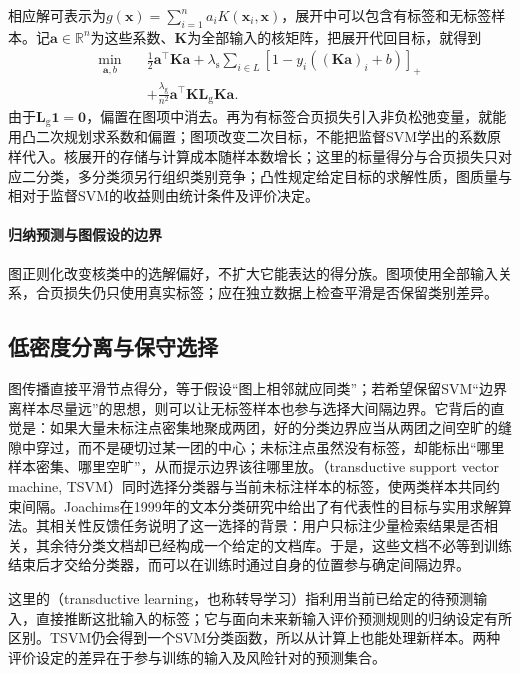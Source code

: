 相应解可表示为$g(\bm{x})=\sum_{i=1}^{n}a_iK(\bm{x}_i,\bm{x})$，展开中可以包含有标签和无标签样本。记$\bm a\in\mathbb R^n$为这些系数、$\bm K$为全部输入的核矩阵，把展开代回目标，就得到
\[
 \begin{aligned}
  \min_{\bm a,b}\quad&\frac12\bm a^\top\bm K\bm a
    +\lambda_{\mathrm s}\sum_{i\in L}[1-y_i((\bm K\bm a)_i+b)]_+\\
    &+\frac{\lambda_{\mathrm g}}{n^2}\bm a^\top\bm K\bm L_{\mathrm g}\bm K\bm a.
 \end{aligned}
\]
由于$\bm L_{\mathrm g}\bm1=\bm0$，偏置在图项中消去。再为有标签合页损失引入非负松弛变量，就能用凸二次规划求系数和偏置；图项改变二次目标，不能把监督SVM学出的系数原样代入。核展开的存储与计算成本随样本数增长；这里的标量得分与合页损失只对应二分类，多分类须另行组织类别竞争；凸性规定给定目标的求解性质，图质量与相对于监督SVM的收益则由统计条件及评价决定。

\paragraph{归纳预测与图假设的边界}
图正则化改变核类中的选解偏好，不扩大它能表达的得分族。图项使用全部输入关系，合页损失仍只使用真实标签；应在独立数据上检查平滑是否保留类别差异。

\subsection{低密度分离与保守选择}
\label{sec:classification-low-density}

图传播直接平滑节点得分，等于假设“图上相邻就应同类”；若希望保留SVM“边界离样本尽量远”的思想，则可以让无标签样本也参与选择大间隔边界。它背后的直觉是：如果大量未标注点密集地聚成两团，好的分类边界应当从两团之间空旷的缝隙中穿过，而不是硬切过某一团的中心；未标注点虽然没有标签，却能标出“哪里样本密集、哪里空旷”，从而提示边界该往哪里放。（transductive support vector machine, TSVM）同时选择分类器与当前未标注样本的标签，使两类样本共同约束间隔。Joachims在1999年的文本分类研究中给出了有代表性的目标与实用求解算法。其相关性反馈任务说明了这一选择的背景：用户只标注少量检索结果是否相关，其余待分类文档却已经构成一个给定的文档库。于是，这些文档不必等到训练结束后才交给分类器，而可以在训练时通过自身的位置参与确定间隔边界。

这里的（transductive learning，也称转导学习）指利用当前已给定的待预测输入，直接推断这批输入的标签；它与面向未来新输入评价预测规则的归纳设定有所区别。TSVM仍会得到一个SVM分类函数，所以从计算上也能处理新样本。两种评价设定的差异在于参与训练的输入及风险针对的预测集合。

